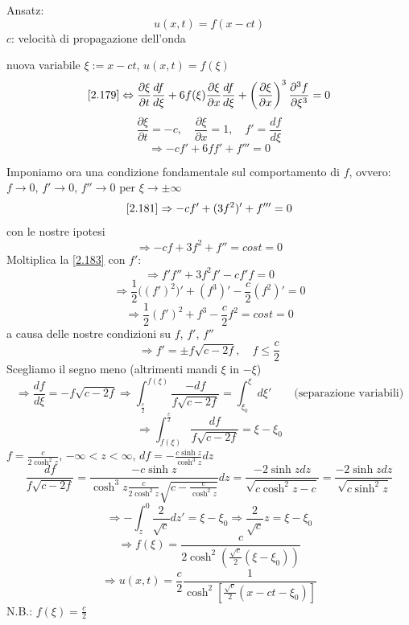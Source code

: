 \documentclass[a4paper,11pt]{report}
\begin{document}
Ansatz: 
\begin{equation}
u(x,t)=f(x-ct)
\label{2.180}
\end{equation}
$c$: velocit\`a di propagazione dell'onda

nuova variabile $\xi:= x-ct$, $u(x,t)=f(\xi)$
\[
\eqref{2.179} \Leftrightarrow \frac{\partial \xi}{\partial t}\frac{df}{d\xi}+6f(\xi)\frac{\partial \xi}{\partial x}\frac{df}{d\xi}+ \left(\frac{\partial \xi}{\partial x}  \right)^3\frac{\partial^3 f}{\partial \xi ^3}=0
\]
\[
\frac{\partial \xi}{\partial t}=-c, \quad \frac{\partial \xi}{\partial x}=1, \quad f'=\frac{df}{d\xi}
\]
\begin{equation}
\Rightarrow -cf' + 6ff' + f'''=0
\label{2.181}
\end{equation}

Imponiamo ora una condizione fondamentale sul comportamento di $f$, ovvero: $f\to 0$, $f'\to 0$, $f''\to 0$ per $\xi \to \pm \infty$
\begin{equation}
\eqref{2.181}\Rightarrow -cf' + (3f^2)' + f'''=0
\label{2.182}
\end{equation}
con le nostre ipotesi
\begin{equation}
\Rightarrow -cf + 3f^2 + f''=cost=0 
\label{2.183}
\end{equation}
Moltiplica la \eqref{2.183} con $f'$:
\[
\Rightarrow f'f'' + 3f^2f'-cf'f=0 
\]
\begin{equation}
\Rightarrow \frac{1}{2} \big((f')^2\big)' + (f^3)' - \frac{c}{2}(f^2)'=0
\label{2.184}
\end{equation}
\[
\Rightarrow \frac{1}{2}(f')^2+f^3-\frac{c}{2}f^2 = cost=0
\]
a causa delle nostre condizioni su $f$, $f'$, $f''$
\begin{equation}
\Rightarrow f'=\pm f\sqrt{c-2f}, \quad f\le \frac{c}{2}
\label{2.185}
\end{equation}
Scegliamo il segno meno (altrimenti mandi $\xi$ in $-\xi$)
\[
\Rightarrow \frac{df}{d\xi}=-f\sqrt{c-2f}\Rightarrow\int_{\frac{c}{2}}^{f(\xi)}\frac{-df}{f\sqrt{c-2f}}=\int_{\xi_0}^{\xi}d\xi' \qquad \text{(separazione variabili)}
\]
\[
\Rightarrow\int_{f(\xi)}^{\frac{c}{2}}\frac{df}{f\sqrt{c-2f}}=\xi - \xi_0
\]
$f=\frac{c}{2\cosh^2 z}$, $-\infty<z<\infty$, $df=-\frac{c\sinh z}{\cosh^3 z}dz$
\[
\frac{df}{f\sqrt{c-2f}}=\frac{-c \sinh z}{\cosh^3 z\frac{c}{2\cosh^2z}\sqrt{c-\frac{c}{\cosh^2 z}}}dz=\frac{-2\sinh z dz}{\sqrt{c\cosh^2z - c}}=\frac{-2\sinh z dz}{\sqrt{c\sinh^2 z}}
\]
\[
\Rightarrow - \int_z^0 \frac{2}{\sqrt{c}}dz'=\xi - \xi_0 \Rightarrow\frac{2}{\sqrt{c}}z=\xi - \xi_0
\]
\[
\Rightarrow f(\xi)=\frac{c}{2\cosh^2 \left(\frac{\sqrt{c}}{2}(\xi-\xi_0)\right)}
\]
\[
\Rightarrow u(x,t)=\frac{c}{2}\frac{1}{\cosh^2 \left[\frac{\sqrt{c}}{2}(x-ct-\xi_0)\right]}
\]
N.B.: $f(\xi)=\frac{c}{2}$
\end{document}
